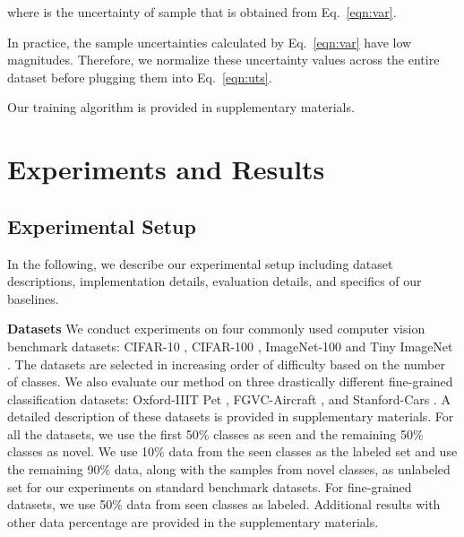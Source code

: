\documentclass[runningheads]{eccv2022submission}
\begin{document}
\setlength{\abovedisplayskip}{-6pt}
\setlength{\belowdisplayskip}{2pt}
\setlength{\abovedisplayshortskip}{0pt}
\setlength{\belowdisplayshortskip}{0pt}

where  is the uncertainty of sample  that is obtained from Eq.~\ref{eqn:var}.


In practice, the sample uncertainties calculated by Eq.~\ref{eqn:var} have low magnitudes. Therefore, we normalize these uncertainty values across the entire dataset before plugging them into Eq.~\ref{eqn:uts}.   


Our training algorithm is provided in supplementary materials. 

\section{Experiments and Results}
\label{sec:exp}
\subsection{Experimental Setup}
In the following, we describe our experimental setup including dataset descriptions, implementation details, evaluation details, and specifics of our baselines. 

\vspace{1mm}
\label{para:dataset}
\noindent \textbf{Datasets} We conduct experiments on four commonly used computer vision benchmark datasets: CIFAR-10 \cite{cifar10}, CIFAR-100 \cite{cifar100}, ImageNet-100 \cite{russakovsky2015imagenet} and Tiny ImageNet \cite{le2015tiny}. The datasets are selected in increasing order of difficulty based on the number of classes. We also evaluate our method on three drastically different fine-grained classification datasets: Oxford-IIIT Pet \cite{parkhi12a}, FGVC-Aircraft \cite{maji13fine-grained}, and Stanford-Cars \cite{KrauseStarkDengFei-Fei_3DRR2013}. A detailed description of these datasets is provided in supplementary materials. For all the datasets, we use the first 50\% classes as seen and the remaining 50\% classes as novel. We use 10\% data from the seen classes as the labeled set and use the remaining 90\% data, along with the samples from novel classes, as unlabeled set for our experiments on standard benchmark datasets. For fine-grained datasets, we use 50\% data from seen classes as labeled. Additional results with other data percentage are provided in the supplementary materials.
\end{document}
